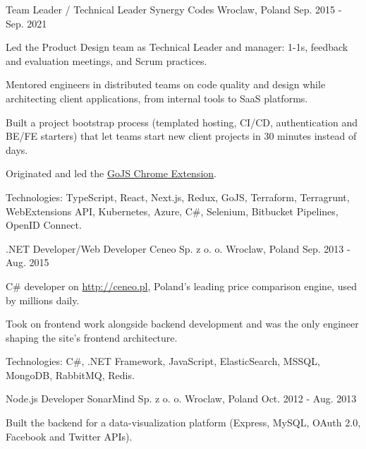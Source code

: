 \begin{cventries}
  \cventry
    {Team Leader / Technical Leader} %
    {Synergy Codes} %
    {Wroclaw, Poland} %
    {Sep. 2015 - Sep. 2021} %
    {
      \begin{cvitems} %
        \item {Led the Product Design team as Technical Leader and manager: 1-1s, feedback and evaluation meetings, and Scrum practices.}
        \item {Mentored engineers in distributed teams on code quality and design while architecting client applications, from internal tools to SaaS platforms.}
        \item {Built a project bootstrap process (templated hosting, CI/CD, authentication and BE/FE starters) that let teams start new client projects in 30 minutes instead of days.}
        \item {Originated and led the \href{https://chromewebstore.google.com/detail/gojs/fejlgenbfgohpgkoddodidiahhjggald}{GoJS Chrome Extension}.}
        \item {Technologies: TypeScript, React, Next.js, Redux, GoJS, Terraform, Terragrunt, WebExtensions API, Kubernetes, Azure, C\#, Selenium, Bitbucket Pipelines, OpenID Connect.}
      \end{cvitems}
    }

  \cventry
    {.NET Developer/Web Developer} %
    {Ceneo Sp. z o. o.} %
    {Wroclaw, Poland} %
    {Sep. 2013 - Aug. 2015} %
    {
      \begin{cvitems} %
        \item {C\# developer on \href{http://ceneo.pl}{http://ceneo.pl}, Poland's leading price comparison engine, used by millions daily.}
        \item {Took on frontend work alongside backend development and was the only engineer shaping the site's frontend architecture.}
        \item {Technologies: C\#, .NET Framework, JavaScript, ElasticSearch, MSSQL, MongoDB, RabbitMQ, Redis.}
      \end{cvitems}
    }

  \cventry
    {Node.js Developer} %
    {SonarMind Sp. z o. o.} %
    {Wroclaw, Poland} %
    {Oct. 2012 - Aug. 2013} %
    {
      \begin{cvitems} %
        \item {Built the backend for a data-visualization platform (Express, MySQL, OAuth 2.0, Facebook and Twitter APIs).}
      \end{cvitems}
    }


\end{cventries}

